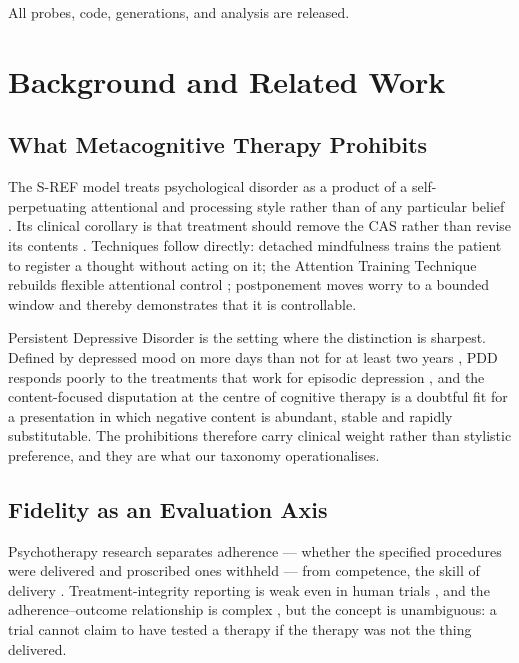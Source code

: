 \documentclass[conference]{IEEEtran}
\begin{document}
All probes, code, generations, and analysis are released.

\section{Background and Related Work}

\subsection{What Metacognitive Therapy Prohibits}

The S-REF model treats psychological disorder as a product of a self-perpetuating
attentional and processing style rather than of any particular belief
\cite{wells1996sref}. Its clinical corollary is that treatment should remove the
CAS rather than revise its contents \cite{wells2009mct}. Techniques follow
directly: detached mindfulness trains the patient to register a thought without
acting on it; the Attention Training Technique rebuilds flexible attentional
control \cite{papageorgiou2000att}; postponement moves worry to a bounded window
and thereby demonstrates that it is controllable.

Persistent Depressive Disorder is the setting where the distinction is sharpest.
Defined by depressed mood on more days than not for at least two years
\cite{apa2013dsm5}, PDD responds poorly to the treatments that work for episodic
depression \cite{schramm2020pdd,cuijpers2010chronic}, and the content-focused
disputation at the centre of cognitive therapy is a doubtful fit for a
presentation in which negative content is abundant, stable and rapidly
substitutable. The prohibitions therefore carry clinical weight rather than
stylistic preference, and they are what our taxonomy operationalises.

\subsection{Fidelity as an Evaluation Axis}

Psychotherapy research separates adherence --- whether the specified procedures
were delivered and proscribed ones withheld --- from competence, the skill of
delivery \cite{waltz1993adherence}. Treatment-integrity reporting is weak even in
human trials \cite{perepletchikova2007integrity}, and the adherence--outcome
relationship is complex \cite{webb2010adherence}, but the concept is
unambiguous: a trial cannot claim to have tested a therapy if the therapy was not
the thing delivered.
\end{document}
